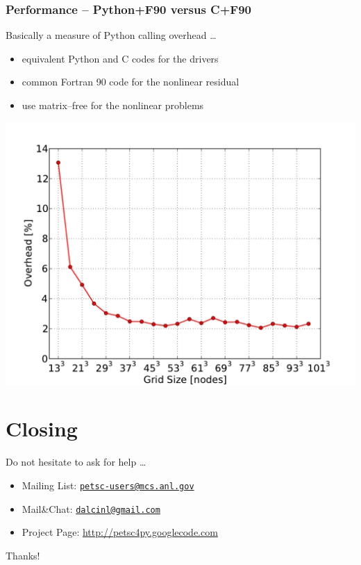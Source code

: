 \documentclass{beamer}
\newcommand{\email}[1]{\href{mailto:#1}{\texttt{#1}}}
\begin{document}
\begin{frame}
  \frametitle{Performance -- Python+F90 versus C+F90}
  Basically a measure of Python calling overhead \ldots
  \begin{itemize}
  \item equivalent Python and C codes for the drivers
  \item common Fortran 90 code for the nonlinear residual
  \item use matrix--free for the nonlinear problems
  \end{itemize}
  \begin{center}
    \includegraphics[scale=0.4]{petsc4py_oh.pdf}
  \end{center}
\end{frame}



\section*{Closing}

\begin{frame}
  \Large
  Do not hesitate to ask for help \ldots 
  \bigskip
  \begin{itemize}
  \item Mailing List: \email{petsc-users@mcs.anl.gov}
  \item Mail\&Chat:   \email{dalcinl@gmail.com}
  \item Project Page: \url{http://petsc4py.googlecode.com}
  \end{itemize}
  \bigskip
  \begin{centering}
    \Huge Thanks!\par
  \end{centering}
\end{frame}
\end{document}
